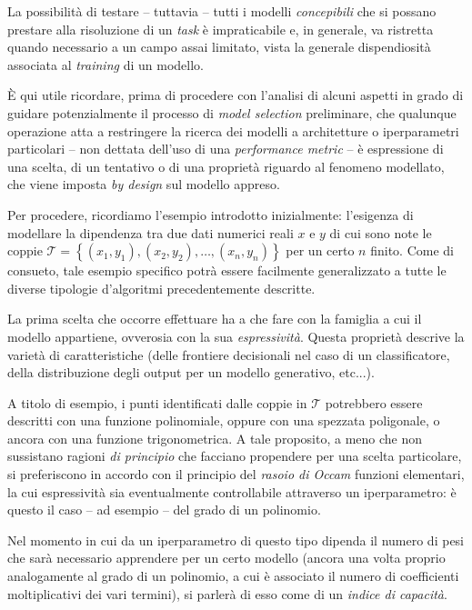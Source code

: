 \documentclass[a4paper, twoside]{article}
\begin{document}
La possibilità di testare -- tuttavia -- tutti i modelli \textit{concepibili} che si possano prestare alla risoluzione di un \textit{task} è impraticabile e, in generale, va ristretta quando necessario a un campo assai limitato, vista la generale dispendiosità associata al \textit{training} di un modello.

È qui utile ricordare, prima di procedere con l'analisi di alcuni aspetti in grado di guidare potenzialmente il processo di \textit{model selection} preliminare, che qualunque operazione atta a restringere la ricerca dei modelli a architetture o iperparametri particolari -- non dettata dell'uso di una \textit{performance metric} -- è espressione di una scelta, di un tentativo o di una proprietà riguardo al fenomeno modellato, che viene imposta \textit{by design} sul modello appreso.

Per procedere, ricordiamo l'esempio introdotto inizialmente: l'esigenza di modellare la dipendenza tra due dati numerici reali $x$ e $y$ di cui sono note le coppie $\mathcal{T} = \left\{(x_1, y_1), (x_2, y_2), \dots,(x_n, y_n) \right\}$ per un certo $n$ finito. Come di consueto, tale esempio specifico potrà essere facilmente generalizzato a tutte le diverse tipologie d'algoritmi precedentemente descritte.

La prima scelta che occorre effettuare ha a che fare con la famiglia a cui il modello appartiene, ovverosia con la sua \textit{espressività}. Questa proprietà descrive la varietà di caratteristiche (delle frontiere decisionali nel caso di un classificatore, della distribuzione degli output per un modello generativo, etc...).

A titolo di esempio, i punti identificati dalle coppie in $\mathcal{T}$ potrebbero essere descritti con una funzione polinomiale, oppure con una spezzata poligonale, o ancora con una funzione trigonometrica. A tale proposito, a meno che non sussistano ragioni \textit{di principio} che facciano propendere per una scelta particolare, si preferiscono in accordo con il principio del \textit{rasoio di Occam} funzioni elementari, la cui espressività sia eventualmente controllabile attraverso un iperparametro: è questo il caso -- ad esempio -- del grado di un polinomio.

Nel momento in cui da un iperparametro di questo tipo dipenda il numero di pesi che sarà necessario apprendere per un certo modello (ancora una volta proprio analogamente al grado di un polinomio, a cui è associato il numero di coefficienti moltiplicativi dei vari termini), si parlerà di esso come di un \textit{indice di capacità}.
\end{document}
